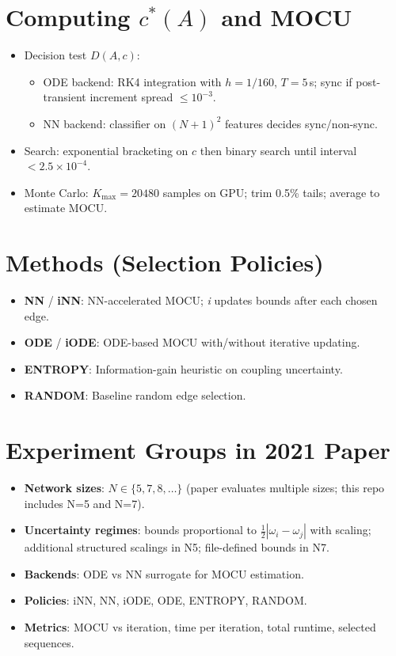 \documentclass[11pt]{article}
\begin{document}
\newpage\section*{Computing $c^*(A)$ and MOCU}
\begin{itemize}
\item Decision test $D(A,c)$:
\begin{itemize}
\item ODE backend: RK4 integration with $h=1/160$, $T=5$\,s; sync if post-transient increment spread $\le 10^{-3}$.
\item NN backend: classifier on \((N{+}1)^2\) features decides sync/non-sync.
\end{itemize}
\item Search: exponential bracketing on $c$ then binary search until interval $< 2.5\times 10^{-4}$.
\item Monte Carlo: $K_{\max}=20480$ samples on GPU; trim 0.5\% tails; average to estimate MOCU.
\end{itemize}

\newpage\section*{Methods (Selection Policies)}
\begin{itemize}
\item \textbf{NN} / \textbf{iNN}: NN-accelerated MOCU; \emph{i} updates bounds after each chosen edge.
\item \textbf{ODE} / \textbf{iODE}: ODE-based MOCU with/without iterative updating.
\item \textbf{ENTROPY}: Information-gain heuristic on coupling uncertainty.
\item \textbf{RANDOM}: Baseline random edge selection.
\end{itemize}

\newpage\section*{Experiment Groups in 2021 Paper}
\begin{itemize}
\item \textbf{Network sizes}: $N\in\{5,7,8,\dots\}$ (paper evaluates multiple sizes; this repo includes N=5 and N=7).
\item \textbf{Uncertainty regimes}: bounds proportional to $\tfrac{1}{2}|\omega_i-\omega_j|$ with scaling; additional structured scalings in N5; file-defined bounds in N7.
\item \textbf{Backends}: ODE vs NN surrogate for MOCU estimation.
\item \textbf{Policies}: iNN, NN, iODE, ODE, ENTROPY, RANDOM.
\item \textbf{Metrics}: MOCU vs iteration, time per iteration, total runtime, selected sequences.
\end{itemize}
\end{document}
